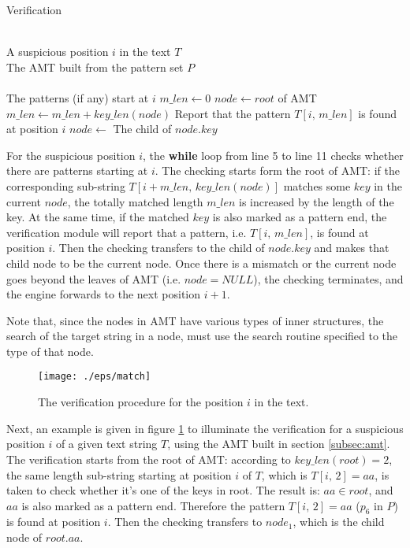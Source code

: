 \documentclass{article}
\begin{document}
\begin{algorithm}
  \caption{Verification}\scriptsize
  \label{alg:matching}
  \begin{algorithmic}[1]
    \REQUIRE ~~\\
    A suspicious position $i$ in the text $T$\\
    The AMT built from the pattern set $P$\\
    \ENSURE ~~\\
    The patterns (if any) start at $i$ 
    \STATE
    \STATE $m\_len \leftarrow 0$
    \STATE $node \leftarrow root$ of AMT
    \STATE
    \STATE $m\_len \leftarrow m\_len + key\_len(node)$
    \STATE Report that the pattern $T[i,\,m\_len]$ is found at position $i$
    \ENDIF
    \STATE $node \leftarrow$ The child of $node.key$
    \ENDWHILE
  \end{algorithmic}
\end{algorithm}

For the suspicious position $i$, the \textbf{while} loop from line 5
to line 11 checks whether there are patterns starting at $i$. The
checking starts form the root of AMT: if the corresponding sub-string
$T[i+m\_len, \, key\_len(node)]$ matches some $key$ in the current
$node$, the totally matched length $m\_len$ is increased by the length
of the key. At the same time, if the matched $key$ is also marked as a
pattern end, the verification module will report that a pattern,
i.e. $T[i,\,m\_len]$, is found at position $i$. Then the checking
transfers to the child of $node.key$ and makes that child node to be
the current node. Once there is a mismatch or the current node goes
beyond the leaves of AMT (i.e.  $node = NULL$), the checking
terminates, and the engine forwards to the next position $i+1$.

Note that, since the nodes in AMT have various types of inner
structures, the search of the target string in a node, must use the
search routine specified to the type of that node.

\begin{figure}[htbp]
  \centering
  \texttt{[image: ./eps/match]}
  \caption{The verification procedure for the position $i$ in the
    text.}
  \label{fig:matching}
\end{figure}

Next, an example is given in figure \ref{fig:matching} to illuminate
the verification for a suspicious position $i$ of a given text string
$T$, using the AMT built in section \ref{subsec:amt}. The verification
starts from the root of AMT: according to $key\_len(root)=2$, the same
length sub-string starting at position $i$ of $T$, which is
$T[i,\,2]=aa$, is taken to check whether it's one of the keys in
root. The result is: $aa \in root$, and $aa$ is also marked as a
pattern end. Therefore the pattern $T[i,\,2]=aa$ ($p_6$ in $P$) is
found at position $i$. Then the checking transfers to $node_1$, which
is the child node of $root.aa$.
\end{document}
